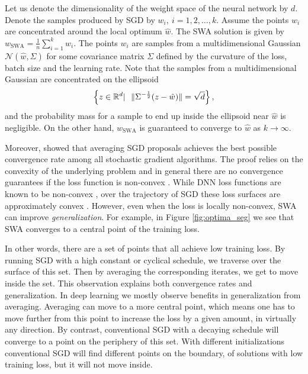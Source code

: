 \documentclass[letterpaper]{article}
\begin{document}
Let us denote the dimensionality of the weight space of the neural network by $d$.
Denote the samples produced by SGD by $w_{i},~i=1, 2, \ldots, k$. Assume the points
$w_i$ are concentrated around the local optimum $\hat w$. The SWA
solution is given by $w_{\text{SWA}} = \frac 1 n \sum_{i=1}^k w_i$.
The points $w_i$ are samples from a multidimensional Gaussian $\mathcal{N}(\hat w, \Sigma)$
for some covariance matrix $\Sigma$ defined by the curvature of the loss, batch
size and the learning rate. Note that the samples from a multidimensional 
Gaussian are concentrated on the ellipsoid
\begin{align}
  \notag
  \left\{ z \in \mathbb{R}^d \vert~~ \|\Sigma^{-\frac{1}{2}} (z - \hat w)\| = \sqrt d\right\},
\end{align}
and the probability mass for a sample to end up inside the ellipsoid near 
$\hat w$ is negligible.
On the other hand, $w_{\text{SWA}}$ is guaranteed to converge to $\hat w$ 
as $k \rightarrow \infty$.

Moreover, \citet{polyak1992} showed that averaging SGD proposals achieves the best possible
convergence rate among all stochastic gradient algorithms.
The proof relies on the convexity of the underlying problem and
in general there are no convergence guarantees if the loss function is
non-convex \citep[see e.g.][]{ghadimi2013}.
While DNN loss functions are known to be non-convex \citep[e.g.][]{choromanska2015},
over the trajectory of SGD these loss surfaces are approximately convex
\citep[e.g.][]{goodfellow2015}.
However, even when the loss is locally non-convex, SWA can 
improve \emph{generalization}. For example, in Figure \ref{fig:optima_seg} we see that
SWA converges to a central point of the training loss.

In other words, there are a set of points that all achieve low training loss. By running SGD 
with a high constant or cyclical schedule, we traverse over the surface of this set. Then by
averaging the corresponding iterates, we get to move inside the set. This observation explains
both convergence rates and generalization. In deep learning we mostly observe benefits in 
generalization from averaging. Averaging can move to a more central point, which
means one has to move further from this point to increase the loss by a given amount, 
in virtually any direction. By contrast, conventional SGD with a decaying schedule will converge to a point
on the periphery of this set. With different initializations conventional SGD will find different points on the boundary,
of solutions with low training loss, but it will not move inside.
\end{document}
